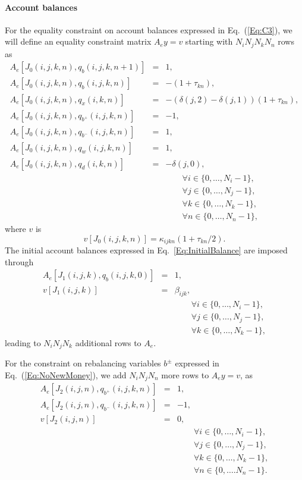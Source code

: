 \documentclass{report}[fleqn,12pt]
\begin{document}
\paragraph*{Account balances}
For the equality constraint on account balances expressed in Eq.~(\ref{Eq:C3}),
we will define an equality constraint matrix $A_ey = v$ starting
with $N_iN_jN_kN_n$ rows as
\begin{eqnarray}
	\label{Eq:B1}
	A_e[J_0(i, j, k, n), q_b(i, j, k, n+1)] &=& 1, \nonumber \\
	A_e[J_0(i, j, k, n), q_b(i, j, k, n)] &=& -(1 + \tau_{kn}), \nonumber \\
	A_e[J_0(i, j, k, n), q_x(i, k, n)] &=& -(\delta(j, 2) - \delta(j, 1))(1 + \tau_{kn}), \nonumber \\
	A_e[J_0(i, j, k, n), q_{b^+}(i, j, k, n)] &=& -1, \nonumber \\
	A_e[J_0(i, j, k, n), q_{b^-}(i, j, k, n)] &=&  1, \nonumber \\
	A_e[J_0(i, j, k, n), q_w(i, j, k, n)] &=& 1, \nonumber \\
	A_e[J_0(i, j, k, n), q_d(i, k, n)] &=& -\delta(j, 0), \\
	&&\qquad\forall i \in \{0,\ldots, N_i-1\},\nonumber\\
	&&\qquad\forall j \in \{0,\ldots, N_j-1\},\nonumber\\
	&&\qquad\forall k \in \{0,\ldots, N_k-1\},\nonumber\\
	&&\qquad\forall n \in \{0,\ldots, N_n-1\}, \nonumber
\end{eqnarray}
where $v$ is
\begin{equation}
	v[J_0(i, j, k, n)] = \kappa_{ijkn}(1 + \tau_{kn}/2).
\end{equation}
The initial account balances expressed in Eq.~\ref{Eq:InitialBalance} are imposed through
\begin{eqnarray}
	A_e[J_1(i, j, k), q_b(i, j, k, 0)] &=& 1, \nonumber \\
	v[J_1(i, j, k)] &=& \beta_{ijk},  \\
	&&\qquad\forall i \in \{0,\ldots, N_i-1\},\nonumber\\
	&&\qquad\forall j \in \{0,\ldots, N_j-1\},\nonumber\\
	&&\qquad\forall k \in \{0,\ldots, N_k-1\},\nonumber
\end{eqnarray}
leading to $N_i N_j N_k$ additional rows to $A_e$.

For the constraint on rebalancing variables  $b^\pm$ expressed in Eq.~(\ref{Eq:NoNewMoney}),
we add $N_iN_jN_n$ more rows to $A_ey = v$, as
\begin{eqnarray}
	A_e[J_2(i, j, n), q_{b^+}(i, j, k, n)] &=& 1, \nonumber \\
	A_e[J_2(i, j, n), q_{b^-}(i, j, k, n)] &=& -1, \nonumber \\
	v[J_2(i, j, n)] &=& 0, \\
	&&\qquad\forall i \in \{0,\ldots, N_i-1\},\nonumber\\
	&&\qquad\forall j \in \{0,\ldots, N_j-1\},\nonumber\\
	&&\qquad\forall k \in \{0,\ldots, N_k-1\},\nonumber\\
	&&\qquad\forall n \in \{0,\ldots. N_n-1\}. \nonumber
\end{eqnarray}
\end{document}
